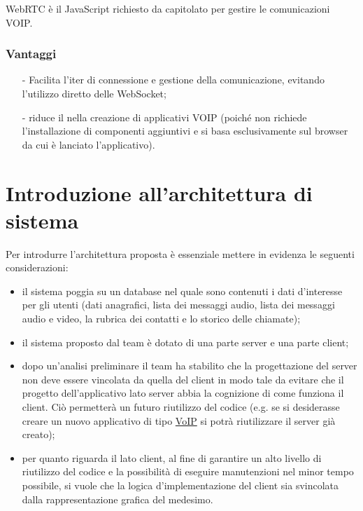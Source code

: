 WebRTC è il  JavaScript richiesto da capitolato per gestire le comunicazioni VOIP.

\subsubsection*{Vantaggi}
\begin{itemize}[noitemsep,nolistsep]
	\item[-] Facilita l'iter di connessione e gestione della comunicazione, evitando l'utilizzo diretto delle WebSocket;
	\item[-] riduce il  nella creazione di applicativi VOIP (poiché non richiede l'installazione di componenti aggiuntivi e si basa esclusivamente sul browser da cui è lanciato l'applicativo).
\end{itemize}

\clearpage

\section{Introduzione all'architettura di sistema}\label{sec:introdesign}
Per introdurre l'architettura proposta è essenziale mettere in evidenza le seguenti considerazioni:
\begin{itemize}
	\item il sistema poggia su un database nel quale sono contenuti i dati d'interesse per gli utenti (dati anagrafici, lista dei messaggi audio, lista dei messaggi audio e video, la rubrica dei contatti e lo storico delle chiamate);
	\item il sistema proposto dal team è dotato di una parte server e una parte client;
	\item dopo un'analisi preliminare il team ha stabilito che la progettazione del server non deve essere vincolata da quella del client in modo tale da evitare che il progetto dell'applicativo lato server abbia la cognizione di come funziona il client. Ciò permetterà un futuro riutilizzo del codice (e.g. se si desiderasse creare un nuovo applicativo di tipo \underline{VoIP} si potrà riutilizzare il server già creato);
	\item per quanto riguarda il lato client, al fine di garantire un alto livello di riutilizzo del codice e la possibilità di eseguire manutenzioni nel minor tempo possibile, si vuole che la logica d'implementazione del client sia svincolata dalla rappresentazione grafica del medesimo.
\end{itemize}

